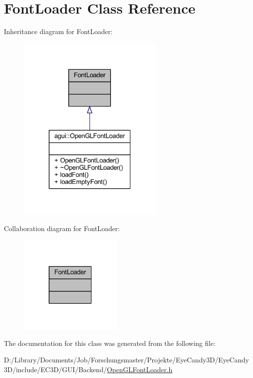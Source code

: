 \hypertarget{class_font_loader}{}\section{Font\+Loader Class Reference}
\label{class_font_loader}


Inheritance diagram for Font\+Loader\+:\nopagebreak
\begin{figure}[H]
\begin{center}
\leavevmode
\includegraphics[width=205pt]{class_font_loader__inherit__graph}
\end{center}
\end{figure}


Collaboration diagram for Font\+Loader\+:\nopagebreak
\begin{figure}[H]
\begin{center}
\leavevmode
\includegraphics[width=145pt]{class_font_loader__coll__graph}
\end{center}
\end{figure}


The documentation for this class was generated from the following file\+:\begin{DoxyCompactItemize}
\item 
D\+:/\+Library/\+Documents/\+Job/\+Forschungsmaster/\+Projekte/\+Eye\+Candy3\+D/\+Eye\+Candy3\+D/include/\+E\+C3\+D/\+G\+U\+I/\+Backend/\mbox{\hyperlink{_open_g_l_font_loader_8h}{Open\+G\+L\+Font\+Loader.\+h}}\end{DoxyCompactItemize}
